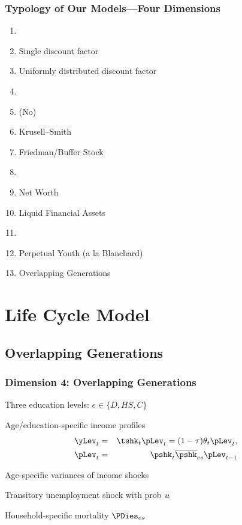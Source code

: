 \begin{frame}
\frametitle{{Typology of Our Models---{Four Dimensions}}}

\begin{block}{}\footnotesize
\begin{enumerate}
\item<0-0> 
\bi \scriptsize
\item {} Single discount factor
\item {} Uniformly distributed discount factor
\ei
\item<0-0> 
\bi \scriptsize
\item (No)
\item Krusell--Smith
\item Friedman/Buffer Stock
\ei
\item<0-0> 
\bi \scriptsize
\item Net Worth
\item Liquid Financial Assets
\ei
\item<1-> 
\bi \scriptsize
\item Perpetual Youth (a la Blanchard)
\item Overlapping Generations
\ei
\end{enumerate}
\end{block}

\end{frame}


\section{Life Cycle Model}
\subsection{Overlapping Generations}
\begin{frame}
\frametitle{Dimension 4: Overlapping Generations}
\bi
\item Three education levels: $e\in\{D, HS, C\}$
\item Age/education-specific income profiles
\begin{eqnarray*}
\yLev_t &=& \tshk_t \pLev_t = (1 - \tau)\theta_t \pLev_t,\\
\pLev_t &=& \pshk_t \overline{\pshk}_{es} \pLev_{t-1}
\end{eqnarray*}
\bi
\item Age-specific variances of income shocks
\item Transitory unemployment shock with prob $u$
\ei
\item Household-specific mortality $\PDies_{es}$
\ei
\end{frame}

